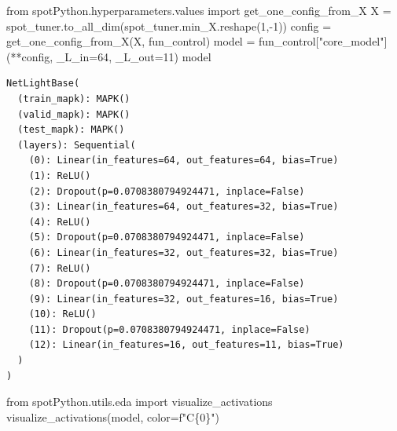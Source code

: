 \documentclass[
  letterpaper,
  DIV=11,
  numbers=noendperiod]{scrreprt}
\newenvironment{Shaded}{\begin{snugshade}}{\end{snugshade}}
\newcommand{\DecValTok}[1]{\textcolor[rgb]{0.68,0.00,0.00}{#1}}
\newcommand{\ImportTok}[1]{\textcolor[rgb]{0.00,0.46,0.62}{#1}}
\newcommand{\NormalTok}[1]{\textcolor[rgb]{0.00,0.23,0.31}{#1}}
\newcommand{\OperatorTok}[1]{\textcolor[rgb]{0.37,0.37,0.37}{#1}}
\newcommand{\SpecialCharTok}[1]{\textcolor[rgb]{0.37,0.37,0.37}{#1}}
\newcommand{\SpecialStringTok}[1]{\textcolor[rgb]{0.13,0.47,0.30}{#1}}
\newcommand{\StringTok}[1]{\textcolor[rgb]{0.13,0.47,0.30}{#1}}
\begin{document}
\begin{Shaded}
\begin{Highlighting}[]
\ImportTok{from}\NormalTok{ spotPython.hyperparameters.values }\ImportTok{import}\NormalTok{ get\_one\_config\_from\_X}
\NormalTok{X }\OperatorTok{=}\NormalTok{ spot\_tuner.to\_all\_dim(spot\_tuner.min\_X.reshape(}\DecValTok{1}\NormalTok{,}\OperatorTok{{-}}\DecValTok{1}\NormalTok{))}
\NormalTok{config }\OperatorTok{=}\NormalTok{ get\_one\_config\_from\_X(X, fun\_control)}
\NormalTok{model }\OperatorTok{=}\NormalTok{ fun\_control[}\StringTok{"core\_model"}\NormalTok{](}\OperatorTok{**}\NormalTok{config, \_L\_in}\OperatorTok{=}\DecValTok{64}\NormalTok{, \_L\_out}\OperatorTok{=}\DecValTok{11}\NormalTok{)}
\NormalTok{model}
\end{Highlighting}
\end{Shaded}

\begin{verbatim}
NetLightBase(
  (train_mapk): MAPK()
  (valid_mapk): MAPK()
  (test_mapk): MAPK()
  (layers): Sequential(
    (0): Linear(in_features=64, out_features=64, bias=True)
    (1): ReLU()
    (2): Dropout(p=0.0708380794924471, inplace=False)
    (3): Linear(in_features=64, out_features=32, bias=True)
    (4): ReLU()
    (5): Dropout(p=0.0708380794924471, inplace=False)
    (6): Linear(in_features=32, out_features=32, bias=True)
    (7): ReLU()
    (8): Dropout(p=0.0708380794924471, inplace=False)
    (9): Linear(in_features=32, out_features=16, bias=True)
    (10): ReLU()
    (11): Dropout(p=0.0708380794924471, inplace=False)
    (12): Linear(in_features=16, out_features=11, bias=True)
  )
)
\end{verbatim}

\begin{Shaded}
\begin{Highlighting}[]
\ImportTok{from}\NormalTok{ spotPython.utils.eda }\ImportTok{import}\NormalTok{ visualize\_activations}
\NormalTok{visualize\_activations(model, color}\OperatorTok{=}\SpecialStringTok{f"C}\SpecialCharTok{\{}\DecValTok{0}\SpecialCharTok{\}}\SpecialStringTok{"}\NormalTok{)}
\end{Highlighting}
\end{Shaded}
\end{document}
